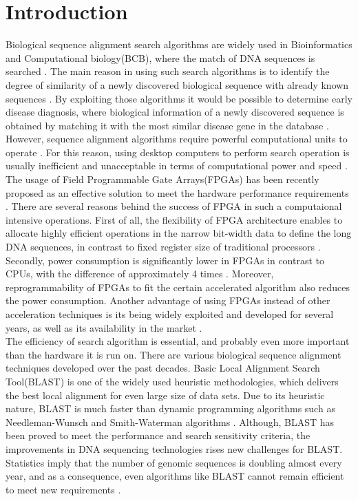 \section{Introduction}
\label{sec:introduction}
Biological sequence alignment search algorithms are widely used in Bioinformatics and Computational biology(BCB), where the match of DNA sequences is searched \cite{kasap2008design}. The main reason in using such search algorithms is to identify the degree of similarity of a newly discovered biological sequence with already known sequences \cite{kasap2008design}. By exploiting those algorithms it would be possible to determine early disease diagnosis, where biological information of a newly discovered sequence is obtained by matching it with the most similar disease gene in the database \cite{guo2012systolic}. However, sequence alignment algorithms require powerful computational units to operate \cite{datta2009}. For this reason, using desktop computers to perform search operation is usually inefficient and unacceptable in terms of computational power and speed \cite{masato2016}.  
\\

The usage of Field Programmable Gate Arrays(FPGAs) has been recently proposed as an effective solution to meet the hardware performance requirements \cite{kasap2008design}. There are several reasons behind the success of FPGA in such a computaional intensive operations. First of all, the flexibility of FPGA architecture enables to allocate highly efficient operations in the narrow bit-width data to define the long DNA sequences, in contrast to fixed register size of traditional processors \cite{cug2007}. Secondly, power consumption is significantly lower in FPGAs in contrast to CPUs, with the difference of approximately 4 times \cite{cug2007}. Moreover, reprogrammability of FPGAs to fit the certain accelerated algorithm also reduces the power consumption. Another advantage of using FPGAs instead of other acceleration techniques is its being widely exploited and developed for several years, as well as its availability in the market \cite{cug2007}. 
\\

The efficiency of search algorithm is essential, and probably even more important than the hardware it is run on. There are various biological sequence alignment techniques developed over the past decades\cite{mohd2013}. Basic Local Alignment Search Tool(BLAST) is one of the widely used heuristic methodologies, which delivers the best local alignment for even large size of data sets. Due to its heuristic nature, BLAST is much faster than dynamic programming algorithms such as Needleman-Wunsch and Smith-Waterman algorithms \cite{wien2011blastp}. Although, BLAST has been proved to meet the performance and search sensitivity criteria, the improvements in DNA sequencing technologies rises new challenges for BLAST. Statistics imply that the number of genomic sequences is doubling almost every year, and as a consequence, even algorithms like BLAST cannot remain efficient to meet new requirements \cite{wien2011blastp}. 
\\



